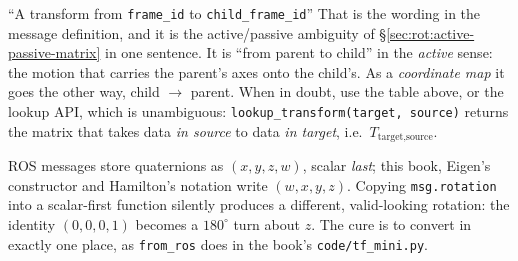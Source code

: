 \begin{noteb}{``A transform from \texttt{frame\_id} to \texttt{child\_frame\_id}''}
That is the wording in the message definition, and it is the active/passive ambiguity of \S\ref{sec:rot:active-passive-matrix} in one sentence. It is ``from parent to child'' in the \emph{active} sense: the motion that carries the parent's axes onto the child's. As a \emph{coordinate map} it goes the other way, child $\to$ parent. When in doubt, use the table above, or the lookup API, which is unambiguous: \texttt{lookup\_transform(target, source)} returns the matrix that takes data \emph{in source} to data \emph{in target}, i.e.\ $T_{\text{target},\text{source}}$.
\end{noteb}

\begin{pitfall}
ROS messages store quaternions as $(x,y,z,w)$, scalar \emph{last}; this book, Eigen's constructor and Hamilton's notation write $(w,x,y,z)$. Copying \texttt{msg.rotation} into a scalar-first function silently produces a different, valid-looking rotation: the identity $(0,0,0,1)$ becomes a $180^\circ$ turn about $z$. The cure is to convert in exactly one place, as \texttt{from\_ros} does in the book's \texttt{code/tf\_mini.py}.
\end{pitfall}
